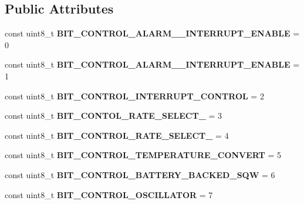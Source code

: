 \subsection*{Public Attributes}
\begin{DoxyCompactItemize}
\item 
\mbox{\label{class_d_s3231_a46147c0e9191b205d02b141e497764fd}} 
const uint8\+\_\+t {\bfseries B\+I\+T\+\_\+\+C\+O\+N\+T\+R\+O\+L\+\_\+\+A\+L\+A\+R\+M\+\_\+\_\+\+I\+N\+T\+E\+R\+R\+U\+P\+T\+\_\+\+E\+N\+A\+B\+LE} = 0
\item 
\mbox{\label{class_d_s3231_adc0c58cb34faa682a39d285613b41840}} 
const uint8\+\_\+t {\bfseries B\+I\+T\+\_\+\+C\+O\+N\+T\+R\+O\+L\+\_\+\+A\+L\+A\+R\+M\+\_\+\_\+\+I\+N\+T\+E\+R\+R\+U\+P\+T\+\_\+\+E\+N\+A\+B\+LE} = 1
\item 
\mbox{\label{class_d_s3231_a60ae50496dfc48ea9d6d4f3be5a270e2}} 
const uint8\+\_\+t {\bfseries B\+I\+T\+\_\+\+C\+O\+N\+T\+R\+O\+L\+\_\+\+I\+N\+T\+E\+R\+R\+U\+P\+T\+\_\+\+C\+O\+N\+T\+R\+OL} = 2
\item 
\mbox{\label{class_d_s3231_aa59a7e767267dcdfd9d3769e65b448e9}} 
const uint8\+\_\+t {\bfseries B\+I\+T\+\_\+\+C\+O\+N\+T\+O\+L\+\_\+\+R\+A\+T\+E\+\_\+\+S\+E\+L\+E\+C\+T\+\_} = 3
\item 
\mbox{\label{class_d_s3231_aeffda7b70a42c5c0010ab9736f24792e}} 
const uint8\+\_\+t {\bfseries B\+I\+T\+\_\+\+C\+O\+N\+T\+R\+O\+L\+\_\+\+R\+A\+T\+E\+\_\+\+S\+E\+L\+E\+C\+T\+\_} = 4
\item 
\mbox{\label{class_d_s3231_af7649567479c112648063a9a299ca9a9}} 
const uint8\+\_\+t {\bfseries B\+I\+T\+\_\+\+C\+O\+N\+T\+R\+O\+L\+\_\+\+T\+E\+M\+P\+E\+R\+A\+T\+U\+R\+E\+\_\+\+C\+O\+N\+V\+E\+RT} = 5
\item 
\mbox{\label{class_d_s3231_a61f60873545487964d4b790fd5300f38}} 
const uint8\+\_\+t {\bfseries B\+I\+T\+\_\+\+C\+O\+N\+T\+R\+O\+L\+\_\+\+B\+A\+T\+T\+E\+R\+Y\+\_\+\+B\+A\+C\+K\+E\+D\+\_\+\+S\+QW} = 6
\item 
\mbox{\label{class_d_s3231_aa65496ef80d4dc0a91c9c3386068593f}} 
const uint8\+\_\+t {\bfseries B\+I\+T\+\_\+\+C\+O\+N\+T\+R\+O\+L\+\_\+\+O\+S\+C\+I\+L\+L\+A\+T\+OR} = 7
\end{DoxyCompactItemize}

